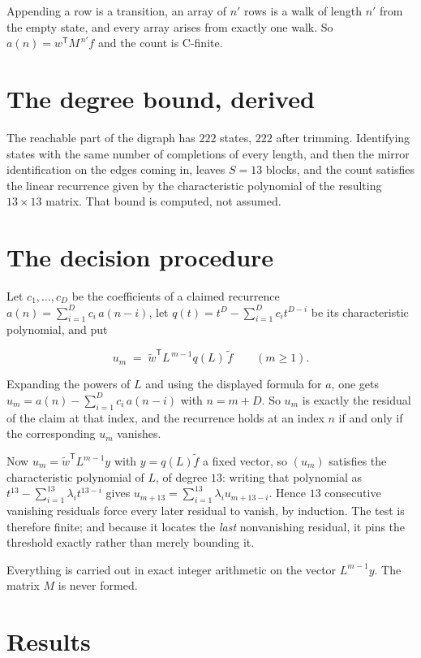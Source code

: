 \documentclass[11pt]{article}
\theoremstyle{definition}
\begin{document}
Appending a row is a transition, an array of $n'$ rows is a walk of length $n'$ from the empty state, and every array arises from exactly one walk. So $a(n) = w^{\mathsf T}M^{\,n'}f$ and the count is C-finite.

\section{The degree bound, derived}

The reachable part of the digraph has $222$ states, $222$ after trimming. Identifying states with the same number of completions of every length, and then the mirror identification on the edges coming in, leaves $S = 13$ blocks, and the count satisfies the linear recurrence given by the characteristic polynomial of the resulting $13\times13$ matrix. That bound is computed, not assumed.

\section{The decision procedure}

Let $c_1,\dots,c_D$ be the coefficients of a claimed recurrence $a(n) = \sum_{i=1}^{D} c_i\,a(n-i)$, let $q(t) = t^{D} - \sum_{i=1}^{D} c_i t^{D-i}$ be its characteristic polynomial, and put

\[u_m \;=\; \tilde w^{\mathsf T} L^{\,m-1} q(L)\,\tilde f \qquad (m \ge 1).\]

Expanding the powers of $L$ and using the displayed formula for $a$, one gets $u_m = a(n) - \sum_{i=1}^{D} c_i\,a(n-i)$ with $n = m + D$. So $u_m$ is exactly the residual of the claim at that index, and the recurrence holds at an index $n$ if and only if the corresponding $u_m$ vanishes.

Now $u_m = \tilde w^{\mathsf T} L^{m-1} y$ with $y = q(L)\tilde f$ a fixed vector, so $(u_m)$ satisfies the characteristic polynomial of $L$, of degree $13$: writing that polynomial as $t^{13} - \sum_{i=1}^{13} \lambda_i t^{13-i}$ gives $u_{m+13} = \sum_{i=1}^{13} \lambda_i u_{m+13-i}$. Hence $13$ consecutive vanishing residuals force every later residual to vanish, by induction. The test is therefore finite; and because it locates the {\itshape last} nonvanishing residual, it pins the threshold exactly rather than merely bounding it.

Everything is carried out in exact integer arithmetic on the vector $L^{m-1}y$. The matrix $M$ is never formed.

\section{Results}
\end{document}
